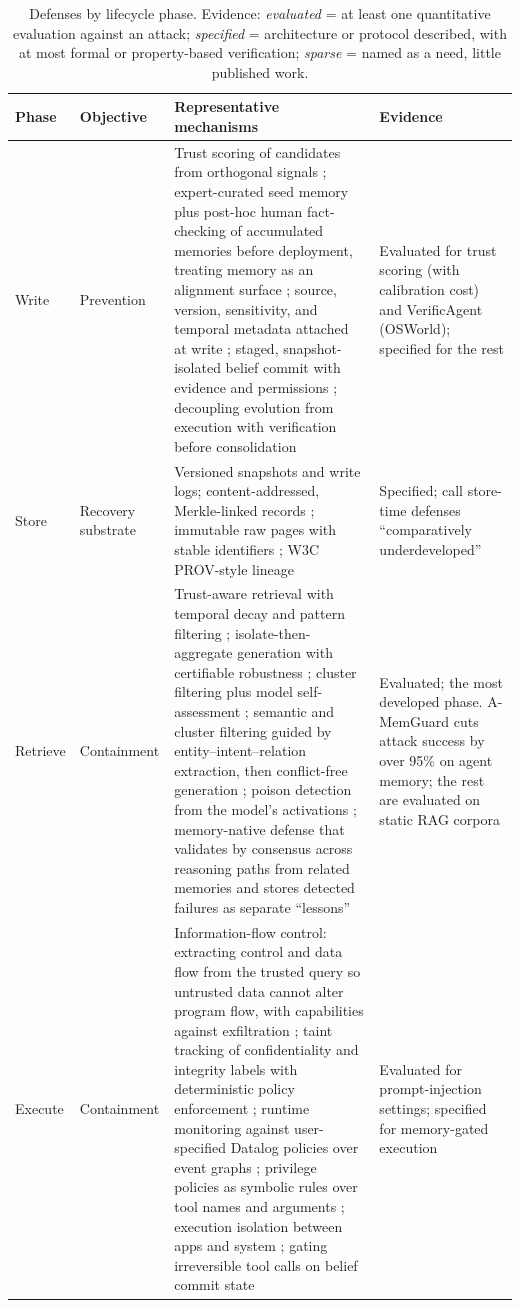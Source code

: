 \documentclass[11pt]{article}
\begin{document}
\begin{table}[p]
\centering\footnotesize
\caption{Defenses by lifecycle phase. Evidence: \emph{evaluated} = at least one quantitative evaluation against an attack; \emph{specified} = architecture or protocol described, with at most formal or property-based verification; \emph{sparse} = named as a need, little published work.}
\label{tab:defenses}
\begin{tabularx}{\textwidth}{L{1.4cm} L{2.05cm} X L{2.5cm}}
\toprule
\textbf{Phase} & \textbf{Objective} & \textbf{Representative mechanisms} & \textbf{Evidence} \\
\midrule
Write & Prevention & Trust scoring of candidates from orthogonal signals \citep{sunil2026poisoning}; expert-curated seed memory plus post-hoc human fact-checking of accumulated memories before deployment, treating memory as an alignment surface \citep{nguyen2025verificagent}; source, version, sensitivity, and temporal metadata attached at write \citep{li2025memos}; staged, snapshot-isolated belief commit with evidence and permissions \citep{li2026memtx}; decoupling evolution from execution with verification before consolidation \citep{lam2026ssgm} & Evaluated for trust scoring (with calibration cost) and VerificAgent (OSWorld); specified for the rest \\
Store & Recovery substrate & Versioned snapshots and write logs; content-addressed, Merkle-linked records \citep{ravindran2026portable}; immutable raw pages with stable identifiers \citep{zhu2026tiermem}; W3C PROV-style lineage \citep{wang2026traces} & Specified; \citet{lin2026security} call store-time defenses ``comparatively underdeveloped'' \\
Retrieve & Containment & Trust-aware retrieval with temporal decay and pattern filtering \citep{sunil2026poisoning}; isolate-then-aggregate generation with certifiable robustness \citep{xiang2024robustrag}; cluster filtering plus model self-assessment \citep{zhou2025trustrag}; semantic and cluster filtering guided by entity--intent--relation extraction, then conflict-free generation \citep{si2025seconrag}; poison detection from the model's activations \citep{tan2025revprag}; memory-native defense that validates by consensus across reasoning paths from related memories and stores detected failures as separate ``lessons'' \citep{wei2025amemguard} & Evaluated; the most developed phase. A-MemGuard cuts attack success by over 95\% on agent memory; the rest are evaluated on static RAG corpora \\
Execute & Containment & Information-flow control: extracting control and data flow from the trusted query so untrusted data cannot alter program flow, with capabilities against exfiltration \citep{debenedetti2025camel}; taint tracking of confidentiality and integrity labels with deterministic policy enforcement \citep{costa2025fides}; runtime monitoring against user-specified Datalog policies over event graphs \citep{palumbo2026pcas}; privilege policies as symbolic rules over tool names and arguments \citep{shi2025progent}; execution isolation between apps and system \citep{wu2025isolategpt}; gating irreversible tool calls on belief commit state \citep{li2026memtx} & Evaluated for prompt-injection settings; specified for memory-gated execution \\

\end{tabularx}
\end{table}
\end{document}
